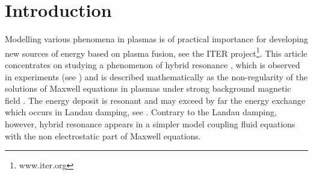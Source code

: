 \section{Introduction}
Modelling various phenomena in plasmas is of practical importance for developing new sources of energy 
based on plasma fusion, see the ITER project\footnote{www.iter.org}. 
This article concentrates on studying a phenomenon of hybrid resonance \cite{Stix}, 
which is observed in experiments (see \cite{reflectometers_2006, reflectometers_2010, Dumont_2005}) and is described
mathematically as the non-regularity of
the solutions of Maxwell equations in plasmas under strong background magnetic field \cite{Despres_2014}. 
The energy deposit is resonant and may exceed by far the energy 
exchange which occurs in Landau damping, see \cite{Freidberg_2007,Mouhot_2011}. 
Contrary to the Landau damping, however, 
hybrid resonance appears in a simpler model coupling 
fluid equations with the non electrostatic part of Maxwell equations.



